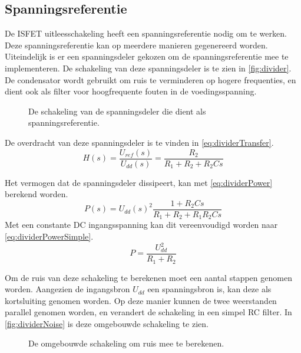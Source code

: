 \subsection{Spanningsreferentie}\label{sec:referenceVoltage}

De ISFET uitleesschakeling heeft een spanningsreferentie nodig om te werken. Deze spanningsreferentie kan op meerdere manieren gegenereerd worden.
Uiteindelijk is er een spanningsdeler gekozen om de spanningsreferentie mee te implementeren. De schakeling van deze spanningsdeler is te zien in \autoref{fig:divider}.
De condensator wordt gebruikt om ruis te verminderen op hogere frequenties, en dient ook als filter voor hoogfrequente fouten in de voedingsspanning.

\begin{figure}[ht]
    \centering
    \def\svgwidth{0.5\textwidth}
    
    \caption{De schakeling van de spanningsdeler die dient als spanningsreferentie.}
    \label{fig:divider}
\end{figure}

\noindent
De overdracht van deze spanningsdeler is te vinden in \autoref{eq:dividerTransfer}.
\begin{equation}\label{eq:dividerTransfer}
    H(s) = \frac{U_{ref}(s)}{U_{dd}(s)} = \frac{R_2}{R_1 + R_2 + R_2Cs}
\end{equation}

\noindent
Het vermogen dat de spanningsdeler dissipeert, kan met \autoref{eq:dividerPower} berekend worden.
\begin{equation}\label{eq:dividerPower}
    P(s) = U_{dd}(s)^2\frac{1+R_2Cs}{R_1 + R_2 + R_1R_2Cs}
\end{equation}
Met een constante DC ingangsspanning kan dit vereenvoudigd worden naar \autoref{eq:dividerPowerSimple}.
\begin{equation}\label{eq:dividerPowerSimple}
    P = \frac{U_{dd}^2}{R_1 + R_2}
\end{equation}

\noindent
Om de ruis van deze schakeling te berekenen moet een aantal stappen genomen worden. Aangezien de ingangsbron $U_{dd}$ een spanningsbron is, kan deze als kortsluiting genomen worden. Op deze manier kunnen de twee weerstanden parallel genomen worden, en verandert de schakeling in een simpel RC filter. In \autoref{fig:dividerNoise} is deze omgebouwde schakeling te zien.

\begin{figure}[ht]
    \centering
    \def\svgwidth{0.35\textwidth}
    
    \caption{De omgebouwde schakeling om ruis mee te berekenen.}
    \label{fig:dividerNoise}
\end{figure}

